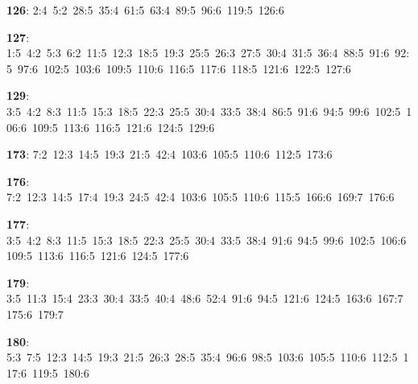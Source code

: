 \noindent \textbf{126}: 2:4\allowbreak\ 5:2\allowbreak\ 28:5\allowbreak\ 35:4\allowbreak\ 61:5\allowbreak\ 63:4\allowbreak\ 89:5\allowbreak\ 96:6\allowbreak\ 119:5\allowbreak\ 126:6\par
\noindent \textbf{127}: 1:5\allowbreak\ 4:2\allowbreak\ 5:3\allowbreak\ 6:2\allowbreak\ 11:5\allowbreak\ 12:3\allowbreak\ 18:5\allowbreak\ 19:3\allowbreak\ 25:5\allowbreak\ 26:3\allowbreak\ 27:5\allowbreak\ 30:4\allowbreak\ 31:5\allowbreak\ 36:4\allowbreak\ 88:5\allowbreak\ 91:6\allowbreak\ 92:5\allowbreak\ 97:6\allowbreak\ 102:5\allowbreak\ 103:6\allowbreak\ 109:5\allowbreak\ 110:6\allowbreak\ 116:5\allowbreak\ 117:6\allowbreak\ 118:5\allowbreak\ 121:6\allowbreak\ 122:5\allowbreak\ 127:6\par
\noindent \textbf{129}: 3:5\allowbreak\ 4:2\allowbreak\ 8:3\allowbreak\ 11:5\allowbreak\ 15:3\allowbreak\ 18:5\allowbreak\ 22:3\allowbreak\ 25:5\allowbreak\ 30:4\allowbreak\ 33:5\allowbreak\ 38:4\allowbreak\ 86:5\allowbreak\ 91:6\allowbreak\ 94:5\allowbreak\ 99:6\allowbreak\ 102:5\allowbreak\ 106:6\allowbreak\ 109:5\allowbreak\ 113:6\allowbreak\ 116:5\allowbreak\ 121:6\allowbreak\ 124:5\allowbreak\ 129:6\par
\noindent \textbf{173}: 7:2\allowbreak\ 12:3\allowbreak\ 14:5\allowbreak\ 19:3\allowbreak\ 21:5\allowbreak\ 42:4\allowbreak\ 103:6\allowbreak\ 105:5\allowbreak\ 110:6\allowbreak\ 112:5\allowbreak\ 173:6\par
\noindent \textbf{176}: 7:2\allowbreak\ 12:3\allowbreak\ 14:5\allowbreak\ 17:4\allowbreak\ 19:3\allowbreak\ 24:5\allowbreak\ 42:4\allowbreak\ 103:6\allowbreak\ 105:5\allowbreak\ 110:6\allowbreak\ 115:5\allowbreak\ 166:6\allowbreak\ 169:7\allowbreak\ 176:6\par
\noindent \textbf{177}: 3:5\allowbreak\ 4:2\allowbreak\ 8:3\allowbreak\ 11:5\allowbreak\ 15:3\allowbreak\ 18:5\allowbreak\ 22:3\allowbreak\ 25:5\allowbreak\ 30:4\allowbreak\ 33:5\allowbreak\ 38:4\allowbreak\ 91:6\allowbreak\ 94:5\allowbreak\ 99:6\allowbreak\ 102:5\allowbreak\ 106:6\allowbreak\ 109:5\allowbreak\ 113:6\allowbreak\ 116:5\allowbreak\ 121:6\allowbreak\ 124:5\allowbreak\ 177:6\par
\noindent \textbf{179}: 3:5\allowbreak\ 11:3\allowbreak\ 15:4\allowbreak\ 23:3\allowbreak\ 30:4\allowbreak\ 33:5\allowbreak\ 40:4\allowbreak\ 48:6\allowbreak\ 52:4\allowbreak\ 91:6\allowbreak\ 94:5\allowbreak\ 121:6\allowbreak\ 124:5\allowbreak\ 163:6\allowbreak\ 167:7\allowbreak\ 175:6\allowbreak\ 179:7\par
\noindent \textbf{180}: 5:3\allowbreak\ 7:5\allowbreak\ 12:3\allowbreak\ 14:5\allowbreak\ 19:3\allowbreak\ 21:5\allowbreak\ 26:3\allowbreak\ 28:5\allowbreak\ 35:4\allowbreak\ 96:6\allowbreak\ 98:5\allowbreak\ 103:6\allowbreak\ 105:5\allowbreak\ 110:6\allowbreak\ 112:5\allowbreak\ 117:6\allowbreak\ 119:5\allowbreak\ 180:6\par
